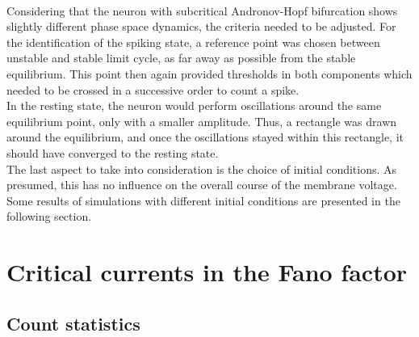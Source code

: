 \documentclass[12pt,a4paper]{article}
\begin{document}
\\
Considering that the neuron with subcritical Andronov-Hopf bifurcation shows slightly different phase space dynamics, the criteria needed to be adjusted. For the identification of the spiking state, a reference point was chosen between unstable and stable limit cycle, as far away as possible from the stable equilibrium. This point then again provided thresholds in both components which needed to be crossed in a successive order to count a spike. \\
In the resting state, the neuron would perform oscillations around the same equilibrium point, only with a smaller amplitude. Thus, a rectangle was drawn around the equilibrium, and once the oscillations stayed within this rectangle, it should have converged to the resting state. \\
The last aspect to take into consideration is the choice of initial conditions. As presumed, this has no influence on the overall course of the membrane voltage. Some results of simulations with different initial conditions are presented in the following section.
\newpage
\section{Critical currents in the Fano factor}
\subsection{Count statistics}
\end{document}
